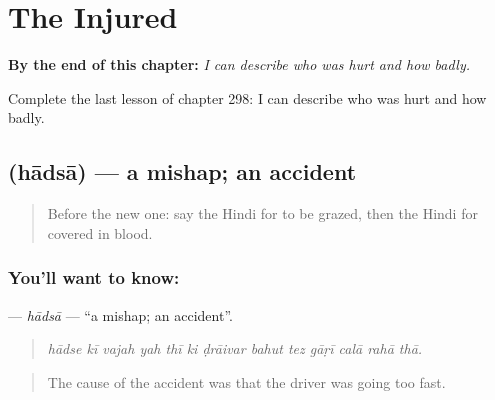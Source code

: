 
\chapter{The Injured}
\label{ch:hi-the-injured}

\begin{chapteropening}
\textbf{By the end of this chapter:} \emph{I can describe who was hurt and how badly.}

Complete the last lesson of chapter 298: I can describe who was hurt and how badly.
\end{chapteropening}

\section[\texorpdfstring{\hi{हादसा} (hādsā)}{हादसा (hādsā)}]{ (hādsā) — a mishap; an accident}

\label{lesson:HI-C298-hadsa}



\begin{quote}
Before the new one: say the Hindi for to be grazed, then the Hindi for covered in blood.
\end{quote}

\subsection*{You'll want to know: }
\textbf{} — \emph{hādsā} — \textquotedblleft{}a mishap; an accident\textquotedblright{}.

\begin{quote}
            
\end{quote}

\begin{quote}
\emph{hādse kī vajah yah thī ki ḍrāivar bahut tez gāṛī calā rahā thā.}
\end{quote}

\begin{quote}
The cause of the accident was that the driver was going too fast.
\end{quote}

